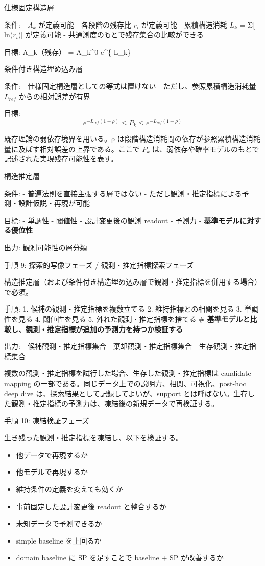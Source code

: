 \documentclass[12pt,a4paper]{article}
\begin{document}
仕様固定構造層

条件: - \(A_{k}\) が定義可能 - 各段階の残存比 \(r_{i}\) が定義可能 - 累積構造消耗 \(L_{k}\) = Σ{[}-ln(\(r_{i}\)){]} が定義可能 - 共通測度のもとで残存集合の比較ができる

目標: \textbar A\_k（残存）\textbar{} = \textbar A\_k\^{}0\textbar{} e\^{}\{-L\_k\}

条件付き構造埋め込み層

条件: - 仕様固定構造層としての等式は置けない - ただし、参照累積構造消耗量 \(L_{ref}\) からの相対誤差が有界

目標: \[
e^{-L_{ref}(1+\rho)} \le P_{k} \le e^{-L_{ref}(1-\rho)}
\]

既存理論の弱依存境界を用いる。ρ は段階構造消耗間の依存が参照累積構造消耗量に及ぼす相対誤差の上界である。ここで \(P_{k}\) は、弱依存や確率モデルのもとで記述された実現残存可能性を表す。

構造推定層

条件: - 普遍法則を直接主張する層ではない - ただし観測・推定指標による予測・設計仮説・再現が可能

目標: - 単調性 - 閾値性 - 設計変更後の観測 readout - 予測力 - \textbf{基準モデルに対する優位性}

出力: 観測可能性の層分類

手順 9: 探索的写像フェーズ / 観測・推定指標探索フェーズ

構造推定層（および条件付き構造埋め込み層で観測・推定指標を併用する場合）で必須。

手順: 1. 候補の観測・推定指標を複数立てる 2. 維持指標との相関を見る 3. 単調性を見る 4. 閾値性を見る 5. 外れた観測・推定指標を捨てる \# \textbf{基準モデルと比較し、観測・推定指標が追加の予測力を持つか検証する}

出力: - 候補観測・推定指標集合 - 棄却観測・推定指標集合 - 生存観測・推定指標集合

複数の観測・推定指標を試行した場合、生存した観測・推定指標は candidate mapping の一部である。同じデータ上での説明力、相関、可視化、post-hoc deep dive は、探索結果として記録してよいが、support とは呼ばない。生存した観測・推定指標の予測力は、凍結後の新規データで再検証する。

手順 10: 凍結検証フェーズ

生き残った観測・推定指標を凍結し、以下を検証する。

\begin{itemize}
\tightlist
\item
  他データで再現するか
\item
  他モデルで再現するか
\item
  維持条件の定義を変えても効くか
\item
  事前固定した設計変更後 readout と整合するか
\item
  未知データで予測できるか
\item
  simple baseline を上回るか
\item
  domain baseline に SP を足すことで baseline + SP が改善するか
\end{itemize}
\end{document}
